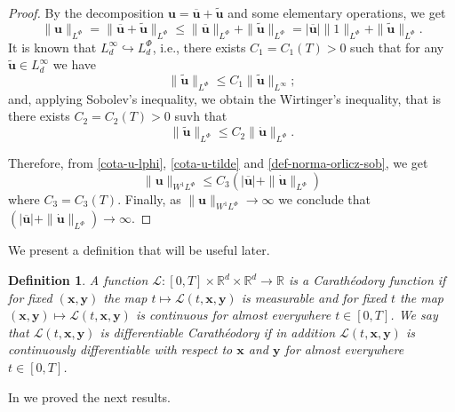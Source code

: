 \documentclass[twoside]{article}
\newtheorem{defi}[thm]{Definition}
\theoremstyle{remark}
\newcommand{\orlnor}{\|_{L^{\Phi}}}
\newcommand{\lphi}{L^{\Phi}}
\newcommand{\sobnor}{\|_{W^{1}\lphi}}
\renewcommand{\b}[1]{\boldsymbol{#1}}
\renewcommand{\leq}{\leqslant}
\begin{document}
\begin{proof}
By the decomposition $\b{u}=\b{\overline u}+\b{\tilde{u}}$ and some elementary operations, 
we get
\begin{equation}\label{cota-u-lphi}
\|\b{u}\orlnor=
\|\b{\overline u}+\b{\tilde{u}}\orlnor\leq 
\|\b{\overline u}\orlnor+\|\b{\tilde{u}}\orlnor=
|\b{\overline u}|\|1\orlnor+\|\b{\tilde{u}}\orlnor.
\end{equation}
It is known that $L^{\infty}_d\hookrightarrow\lphi_d$, i.e.,
there exists $C_1=C_1(T)>0$ such that for any $\b{\tilde{u}}\in L^{\infty}_d$ we have
\[
\|\b{\tilde{u}}\orlnor
\leq 
C_1 \|\b{\tilde{u}}\|_{L^{\infty}};
\]
and, applying  Sobolev's inequality,  we obtain the Wirtinger's inequality, that is there exists $C_2=C_2(T)>0$ suvh that 
\begin{equation}\label{cota-u-tilde}
\|\b{\tilde{u}}\orlnor
\leq 
C_2\|\b{\dot{u}}\orlnor.
\end{equation}

Therefore, from \eqref{cota-u-lphi}, \eqref{cota-u-tilde} and \eqref{def-norma-orlicz-sob}, 
we get
\[
\|\b{u}\sobnor\leq
C_3(|\b{\overline u}|+\|\b{\dot{u}}\orlnor)
\]
where $C_3=C_3(T)$. Finally, as $\|\b{u}\sobnor\to \infty$ we conclude that   
$(|\b{\overline u}|+\|\b{\dot{u}}\orlnor)\to \infty$.
\end{proof}


We present a definition that will be useful later.
 
\begin{defi} A function $\mathcal{L}:[0,T]\times \mathbb{R}^d \times \mathbb{R}^d \rightarrow \mathbb{R}$ is a \emph{Carath\'eodory} function if for fixed $(\b{x},\b{y})$
the map $t \mapsto \mathcal{L}(t, \b{x},\b{y})$ is measurable  and for fixed $t$ the map  $(\b{x},\b{y}) \mapsto \mathcal{L}(t, \b{x}, \b{y})$ is continuous  for almost everywhere $t\in [0,T]$. We say that 
$\mathcal{L}(t, \b{x},\b{y})$ is  \emph{differentiable Carath\'eodory} if in addition $\mathcal{L}(t, \b{x},\b{y})$ is
continuously differentiable with respect to $\b{x}$ and $\b{y}$  for almost everywhere $t\in [0,T]$.

\end{defi}


In \cite{ABGMS2015} we proved the next results.
\end{document}
